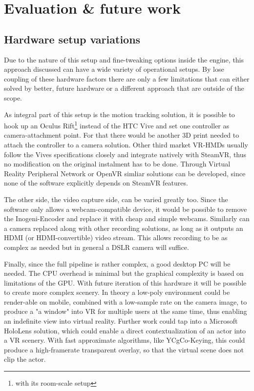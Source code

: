 %
\chapter{Evaluation \& future work}

\section{Hardware setup variations}

Due to the nature of this setup and fine-tweaking options inside the engine, 
this approach discussed can have a wide variety of operational setups. By lose 
coupling of these hardware factors there are only a few limitations that can 
either solved by better, future hardware or a different approach that are 
outside of the scope.

As integral part of this setup is the motion tracking solution, it is possible 
to hook up an Oculus Rift\footnote{with its room-scale setup} instead of the 
HTC Vive and set one controller as camera-attachment point. For that there 
would be another 3D print needed to attach the controller to a camera solution. 
\newline
Other third market VR-HMDs usually follow the Vives specifications closely and 
integrate natively with SteamVR, thus no modification on the original 
instalment has to be done.
\newline
Through Virtual Reality Peripheral Network or OpenVR simliar solutions can be 
developed, since none of the software explicitly depends on SteamVR features.

The other side, the video capture side, can be varied greatly too. Since the 
software only allows a webcam-compatible device, it would be possible to remove 
the Inogeni-Encoder and replace it with cheap and simple webcams. Similarly can 
a camera replaced along with other recording solutions, as long as it outputs 
an HDMI (or HDMI-convertible) video stream. This allows recording to be as 
complex as needed but in general a DSLR camera will suffice.

Finally, since the full pipeline is rather complex, a good desktop PC will be 
needed. The CPU overhead is minimal but the graphical complexity is based on 
limitations of the GPU. With future iteration of this hardware it will be 
possible to create more complex scenery.
In theory a low-poly environment could be render-able on mobile, combined with 
a low-sample rate on the camera image, to produce a "a window" into VR for 
multiple users at the same time, thus enabling an indefinite view into virtual 
reality. Further work could tap into a Microsoft HoloLens solution, which could 
enable a direct contextualization of an actor into a VR scenery. With fast 
approximate algorithms, like YCgCo-Keying, this could produce a high-framerate 
transparent overlay, so that the virtual scene does not clip the actor.

